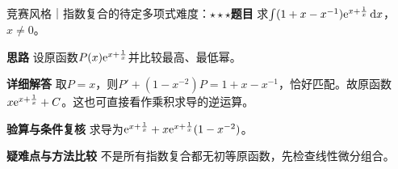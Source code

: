\begin{example}{竞赛风格｜指数复合的待定多项式}{难度：$\star\star\star$}\label{ic:ex:delta_integral:exponentialrecurrence}\textbf{题目} 求$\int(1+x-x^{-1})\mathrm{e}^{x+\frac{1}{x}}\mathop{}\!\mathrm{d} x$，$x\ne0$。\par \textbf{思路} 设原函数$P(x)\mathrm{e}^{x+\frac{1}{x}}$并比较最高、最低幂。\par \textbf{详细解答} 取$P=x$，则$P'+(1-x^{-2})P=1+x-x^{-1}$，恰好匹配。故原函数$x\mathrm{e}^{x+\frac{1}{x}}+C$。这也可直接看作乘积求导的逆运算。\par \textbf{验算与条件复核} 求导为$\mathrm{e}^{x+\frac{1}{x}}+x\mathrm{e}^{x+\frac{1}{x}}(1-x^{-2})$。\par \textbf{疑难点与方法比较} 不是所有指数复合都无初等原函数，先检查线性微分组合。\end{example}
